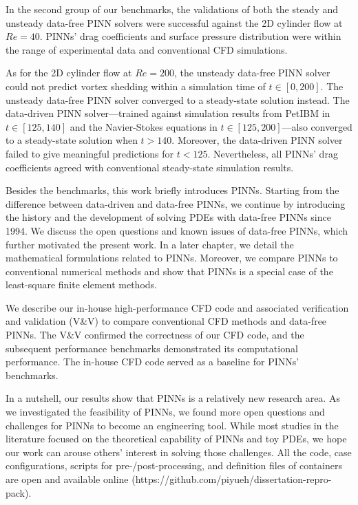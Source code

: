 {In the second group of our benchmarks, the validations of both the steady and unsteady data-free PINN solvers were successful against the 2D cylinder flow at $Re=40$.
PINNs' drag coefficients and surface pressure distribution were within the range of experimental data and conventional CFD simulations.

As for the 2D cylinder flow at $Re=200$, the unsteady data-free PINN solver could not predict vortex shedding within a simulation time of $t\in[0, 200]$.
The unsteady data-free PINN solver converged to a steady-state solution instead.
The data-driven PINN solver---trained against simulation results from PetIBM in $t \in [125, 140]$ and the Navier-Stokes equations in $t\in[125, 200]$---also converged to a steady-state solution when $t > 140$.
Moreover, the data-driven PINN solver failed to give meaningful predictions for $t<125$.
Nevertheless, all PINNs' drag coefficients agreed with conventional steady-state simulation results.

Besides the benchmarks, this work briefly introduces PINNs.
Starting from the difference between data-driven and data-free PINNs, we continue by introducing the history and the development of solving PDEs with data-free PINNs since 1994.
We discuss the open questions and known issues of data-free PINNs, which further motivated the present work.
In a later chapter, we detail the mathematical formulations related to PINNs.
Moreover, we compare PINNs to conventional numerical methods and show that PINNs is a special case of the least-square finite element methods.

We describe our in-house high-performance CFD code and associated verification and validation (V\&V) to compare conventional CFD methods and data-free PINNs.
The V\&V confirmed the correctness of our CFD code, and the subsequent performance benchmarks demonstrated its computational performance.
The in-house CFD code served as a baseline for PINNs' benchmarks.

In a nutshell, our results show that PINNs is a relatively new research area.
As we investigated the feasibility of PINNs, we found more open questions and challenges for PINNs to become an engineering tool.
While most studies in the literature focused on the theoretical capability of PINNs and toy PDEs, we hope our work can arouse others' interest in solving those challenges.
All the code, case configurations, scripts for pre-/post-processing, and definition files of containers are open and available online (https://github.com/piyueh/dissertation-repro-pack).
}
